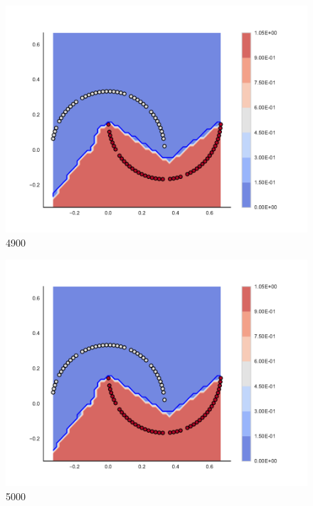 \begin{subfigure}[b]{0.09\textwidth}
    \includegraphics[clip, trim=2.35cm 1.75cm 4.5cm 0cm,width=\textwidth]{img/convergence/4900.pdf}
    \caption{4900}
    \label{fig:convergence_4900}
\end{subfigure}
%
\begin{subfigure}[b]{0.09\textwidth}
    \includegraphics[clip, trim=2.35cm 1.75cm 4.5cm 0cm,width=\textwidth]{img/convergence/5000.pdf}
    \caption{5000}
    \label{fig:convergence_5000}
\end{subfigure}
%
